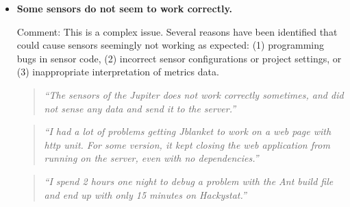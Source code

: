\begin{itemize}
  \item \textbf{Some sensors do not seem to work correctly.}  
    
    Comment: This is a complex issue. Several reasons have been identified that could cause sensors seemingly not working as expected:
    (1) programming bugs in sensor code, 
    (2) incorrect sensor configurations or project settings, 
    or (3) inappropriate interpretation of metrics data.
  
    \begin{quote} \textit{``The sensors of the Jupiter does not work 
           correctly sometimes, and did not sense any data and send 
           it to the server.''} \end{quote}
    \begin{quote} \textit{``I had a lot of problems getting Jblanket 
           to work on a web page with http unit. For some version, 
           it kept closing the web application from running on the server, 
           even with no dependencies.''} \end{quote}  
    \begin{quote} \textit{``I spend 2 hours one night to debug a problem 
           with the Ant build file and end up with only 15 minutes
           on Hackystat.''} \end{quote}

\end{itemize}






